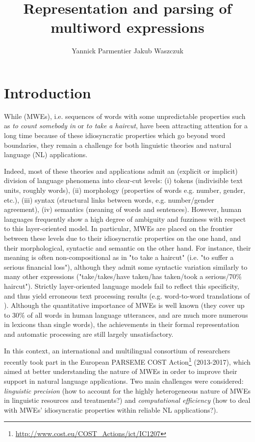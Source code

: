 \documentclass[output=paper]{langsci/langscibook}
\title{Representation and parsing of multiword expressions}
\author{%
 Yannick Parmentier\affiliation{Université d'Orléans}\lastand 
 Jakub Waszczuk\affiliation{Université François Rabelais Tours\\Université d'Orléans}
}
\begin{document}
\section{Introduction} 
While  (MWEs), i.e. sequences of words with some
unpredictable properties such as \textit{to count somebody in} or
\textit{to take a haircut}, have been attracting attention for a long
time because of these idiosyncratic properties which go beyond word
boundaries, they remain a challenge for both linguistic theories and
natural language (NL) applications.

Indeed, most of these theories and applications admit an (explicit or
implicit) division of language phenomena into clear-cut levels:
(i) tokens (indivisible text units, roughly words),
(ii) morphology (properties of words e.g. number, gender, etc.),
(iii) syntax (structural links between words, e.g. number/gender agreement),
(iv) semantics (meaning of words and sentences).
However, human languages frequently show a high degree of ambiguity
and fuzziness with respect to this layer-oriented model. In
particular, MWEs are placed on the frontier between these levels due
to their idiosyncratic properties on the one hand, and their
morphological, syntactic and semantic  on the other
hand. For instance, their meaning is often non-compositional as in "to
take a haircut" (i.e. "to suffer a serious financial loss"), although
they admit some syntactic variation similarly to many other
expressions ("take/takes/have taken/has taken/took a serious/70\%
haircut"). Strictly layer-oriented language models fail to reflect
this specificity, and thus yield erroneous text processing results
(e.g. word-to-word translations of ). Although the quantitative
importance of MWEs is well known (they cover up to 30\% of all words
in human language utterances, and are much more numerous in lexicons
than single words), the achievements in their formal representation
and automatic processing are still largely unsatisfactory.

In this context, an international and multilingual consortium of
researchers recently took part in the European PARSEME COST
Action\footnote{\url{http://www.cost.eu/COST_Actions/ict/IC1207}}
(2013-2017), which aimed at better understanding the nature of MWEs in
order to improve their support in natural language applications. Two
main challenges were considered: \emph{linguistic precision} (how to
account for the highly heterogeneous nature of MWEs in linguistic
resources and treatments?) and \emph{computational efficiency} (how to
deal with MWEs' idiosyncratic properties within reliable NL
applications?).
\end{document}
